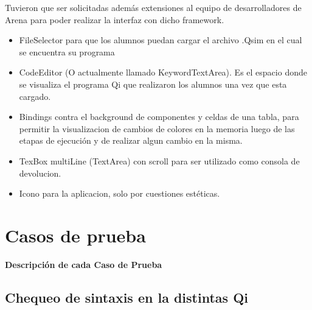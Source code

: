 Tuvieron que ser solicitadas además extensiones al equipo de desarrolladores de Arena para poder realizar la interfaz con dicho framework.

\begin{itemize}
\item FileSelector para que los alumnos puedan cargar el archivo .Qsim en el cual se encuentra su programa
\item CodeEditor (O actualmente llamado KeywordTextArea). Es el espacio donde se visualiza el programa Qi que realizaron los alumnos una vez que esta cargado.
\item Bindings contra el background de componentes y celdas de una tabla, para permitir la visualizacion de cambios de colores en la memoria luego de las etapas de ejecución y de realizar algun cambio en la misma.
\item TexBox multiLine (TextArea) con scroll para ser utilizado como consola de devolucion.
\item Icono para la aplicacion, solo por cuestiones estéticas.
\end{itemize}

\section{Casos de prueba}

\textbf{Descripción de cada Caso de Prueba}

\subsection{Chequeo de sintaxis en la distintas Qi}


